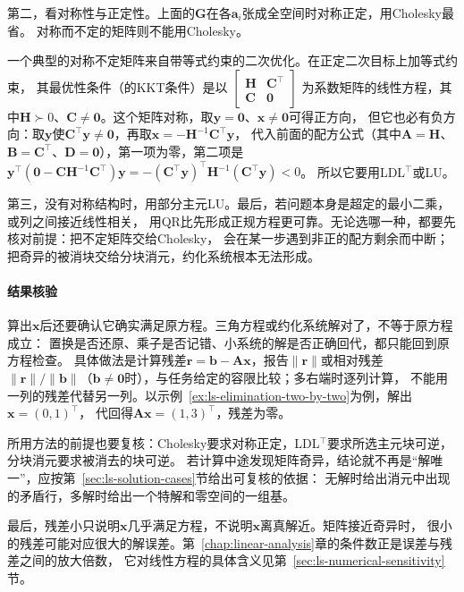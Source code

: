 第二，看对称性与正定性。上面的$\bm G$在各$\bm a_i$张成全空间时对称正定，用Cholesky最省。
对称而不定的矩阵则不能用Cholesky。

一个典型的对称不定矩阵来自带等式约束的二次优化。在正定二次目标上加等式约束，
其最优性条件（的KKT条件）是以
$\left[\begin{smallmatrix}\bm H&\bm C^\top\\\bm C&\bm0\end{smallmatrix}\right]$
为系数矩阵的线性方程，其中$\bm H\succ0$、$\bm C\neq\bm0$。这个矩阵对称，取$\bm y=\bm0$、$\bm x\neq\bm0$可得正方向，
但它也必有负方向：取$\bm y$使$\bm C^\top\bm y\neq\bm0$，再取$\bm x=-\bm H^{-1}\bm C^\top\bm y$，
代入前面的配方公式（其中$\bm A=\bm H$、$\bm B=\bm C^\top$、$\bm D=\bm0$），第一项为零，第二项是
$\bm y^\top(\bm0-\bm C\bm H^{-1}\bm C^\top)\bm y=-(\bm C^\top\bm y)^\top\bm H^{-1}(\bm C^\top\bm y)<0$。
所以它要用LDL$^{\top}$或LU。

第三，没有对称结构时，用部分主元LU。最后，若问题本身是超定的最小二乘，或列之间接近线性相关，
用QR比先形成正规方程更可靠。无论选哪一种，都要先核对前提：把不定矩阵交给Cholesky，
会在某一步遇到非正的配方剩余而中断；把奇异的被消块交给分块消元，约化系统根本无法形成。

\paragraph{结果核验}
\label{sec:ls-linear-equation-verification}

算出$\bm x$后还要确认它确实满足原方程。三角方程或约化系统解对了，不等于原方程成立：
置换是否还原、乘子是否记错、小系统的解是否正确回代，都只能回到原方程检查。
具体做法是计算残差$\bm r=\bm b-\bm A\bm x$，报告$\lVert\bm r\rVert$或相对残差
$\lVert\bm r\rVert/\lVert\bm b\rVert$（$\bm b\neq\bm0$时），与任务给定的容限比较；多右端时逐列计算，
不能用一列的残差代替另一列。以示例~\ref{ex:ls-elimination-two-by-two}为例，解出$\bm x=(0,1)^\top$，
代回得$\bm A\bm x=(1,3)^\top$，残差为零。

所用方法的前提也要复核：Cholesky要求对称正定，LDL$^{\top}$要求所选主元块可逆，分块消元要求被消去的块可逆。
若计算中途发现矩阵奇异，结论就不再是“解唯一”，应按第~\ref{sec:ls-solution-cases}节给出可复核的依据：
无解时给出消元中出现的矛盾行，多解时给出一个特解和零空间的一组基。

最后，残差小只说明$\bm x$几乎满足方程，不说明$\bm x$离真解近。矩阵接近奇异时，
很小的残差可能对应很大的解误差。第~\ref{chap:linear-analysis}章的条件数正是误差与残差之间的放大倍数，
它对线性方程的具体含义见第~\ref{sec:ls-numerical-sensitivity}节。

